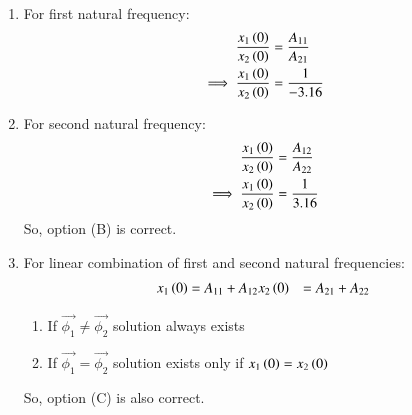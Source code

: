 \documentclass[journal,12pt,twocolumn]{IEEEtran}
\theoremstyle{remark}
\begin{document}
\begin{enumerate}
    \item For first natural frequency: 
    \begin{align}
    \frac{x_1\left(0\right)}{x_2\left(0\right)}&=\frac{A_{11}}{A_{21}}\\
    \implies \frac{x_1\left(0\right)}{x_2\left(0\right)} &= \frac{1}{-3.16}
    \end{align}
    \item For second natural frequency: 
    \begin{align}
    \frac{x_1\left(0\right)}{x_2\left(0\right)}&=\frac{A_{12}}{A_{22}}\\
    \implies \frac{x_1\left(0\right)}{x_2\left(0\right)} &= \frac{1}{3.16}
    \end{align}
    So, option (B) is correct.
    \item For linear combination of first and second natural frequencies:
    \begin{align}
        x_1\left(0\right) &= A_{11}+ A_{12}
        x_2\left(0\right) &= A_{21}+ A_{22}
    \end{align}
    \begin{enumerate}
        \item If $ \vec{\phi_1} \neq \vec{\phi_2}$ solution always exists
        \item If $ \vec{\phi_1} = \vec{\phi_2}$ solution exists only if $ x_1\left(0\right)=x_2\left(0\right)$
    \end{enumerate}
    So, option (C) is also correct.
\end{enumerate}
\end{document}
